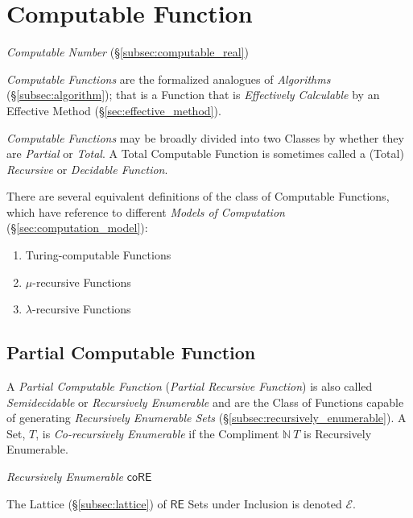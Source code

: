 \documentclass{article}
\begin{document}
\section{Computable Function}\label{sec:computable_function}

\emph{Computable Number} (\S\ref{subsec:computable_real})

\emph{Computable Functions} are the formalized analogues of
\emph{Algorithms} (\S\ref{subsec:algorithm}); that is a Function that
is \emph{Effectively Calculable} by an Effective Method
(\S\ref{sec:effective_method}).

\emph{Computable Functions} may be broadly divided into two Classes by
whether they are \emph{Partial} or \emph{Total}. A Total Computable
Function is sometimes called a (Total) \emph{Recursive} or
\emph{Decidable Function}.

There are several equivalent definitions of the class of Computable
Functions, which have reference to different \emph{Models of
  Computation} (\S\ref{sec:computation_model}):
\begin{enumerate}
\item Turing-computable Functions
\item $\mu$-recursive Functions
\item $\lambda$-recursive Functions
\end{enumerate}

\subsection{Partial Computable Function}\label{subsec:partial_recursive}

A \emph{Partial Computable Function} (\emph{Partial Recursive
  Function}) is also called \emph{Semidecidable} or \emph{Recursively
  Enumerable} and are the Class of Functions capable of generating
\emph{Recursively Enumerable Sets}
(\S\ref{subsec:recursively_enumerable}). A Set, $T$, is
\emph{Co-recursively Enumerable} if the Compliment $\mathbb{N} \ T$ is
Recursively Enumerable.

\emph{Recursively Enumerable} $\mathsf{coRE}$

The Lattice (\S\ref{subsec:lattice}) of $\mathsf{RE}$ Sets under
Inclusion is denoted $\mathcal{E}$.

\end{document}
